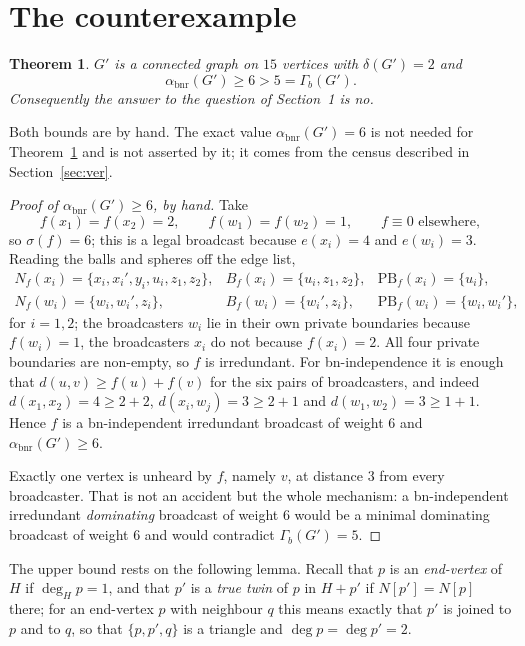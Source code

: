 \documentclass[11pt]{amsart}
\newtheorem{theorem}{Theorem}
\theoremstyle{remark}
\DeclareMathOperator{\bnr}{bnr}
\newcommand{\abnr}{\alpha_{\bnr}}
\newcommand{\Gb}{\Gamma_{b}}
\newcommand{\Gp}{G'}
\newcommand{\PB}{\mathrm{PB}}
\begin{document}
\section{The counterexample}

\begin{theorem}\label{thm:main}
$\Gp$ is a connected graph on $15$ vertices with $\delta(\Gp)=2$ and
\[
 \abnr(\Gp)\ge6>5=\Gb(\Gp).
\]
Consequently the answer to the question of Section~1 is \emph{no}.
\end{theorem}

\noindent
Both bounds are by hand. The exact value $\abnr(\Gp)=6$ is not needed for
Theorem~\ref{thm:main} and is not asserted by it; it comes from the census
described in Section~\ref{sec:ver}.

\begin{proof}[Proof of $\abnr(\Gp)\ge6$, by hand]
Take
\[
 f(x_1)=f(x_2)=2,\qquad f(w_1)=f(w_2)=1,\qquad f\equiv0 \text{ elsewhere},
\]
so $\sigma(f)=6$; this is a legal broadcast because $e(x_i)=4$ and $e(w_i)=3$.
Reading the balls and spheres off the edge list,
\[
\begin{array}{lll}
 N_f(x_i)=\{x_i,x_i',y_i,u_i,z_1,z_2\}, & B_f(x_i)=\{u_i,z_1,z_2\},
 & \PB_f(x_i)=\{u_i\},\\[2pt]
 N_f(w_i)=\{w_i,w_i',z_i\}, & B_f(w_i)=\{w_i',z_i\},
 & \PB_f(w_i)=\{w_i,w_i'\},
\end{array}
\]
for $i=1,2$; the broadcasters $w_i$ lie in their own private boundaries because
$f(w_i)=1$, the broadcasters $x_i$ do not because $f(x_i)=2$. All four private
boundaries are non-empty, so $f$ is irredundant. For bn-independence it is
enough that $d(u,v)\ge f(u)+f(v)$ for the six pairs of broadcasters, and indeed
$d(x_1,x_2)=4\ge2+2$, $d(x_i,w_j)=3\ge2+1$ and $d(w_1,w_2)=3\ge1+1$. Hence $f$
is a bn-independent irredundant broadcast of weight $6$ and $\abnr(\Gp)\ge6$.

Exactly one vertex is unheard by $f$, namely $v$, at distance $3$ from every
broadcaster. That is not an accident but the whole mechanism: a bn-independent
irredundant \emph{dominating} broadcast of weight $6$ would be a minimal
dominating broadcast of weight $6$ and would contradict $\Gb(\Gp)=5$.
\end{proof}

The upper bound rests on the following lemma. Recall that $p$ is an
\emph{end-vertex} of $H$ if $\deg_Hp=1$, and that $p'$ is a \emph{true twin} of
$p$ in $H+p'$ if $N[p']=N[p]$ there; for an end-vertex $p$ with neighbour $q$
this means exactly that $p'$ is joined to $p$ and to $q$, so that $\{p,p',q\}$ is
a triangle and $\deg p=\deg p'=2$.
\end{document}
